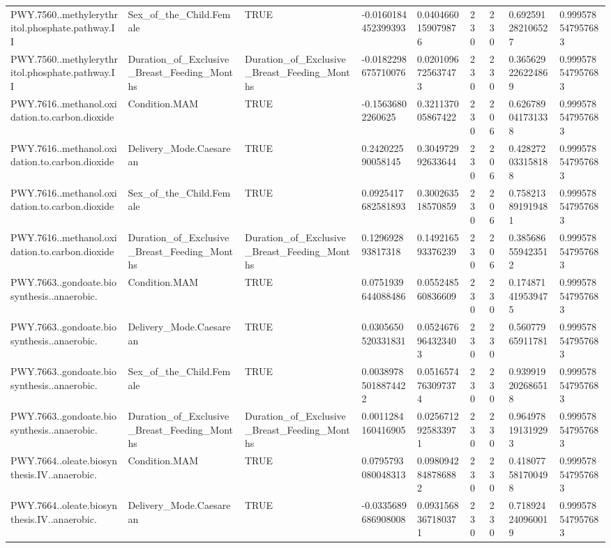 \begin{longtable}{lllllllll}
PWY.7560..methylerythritol.phosphate.pathway.II & Sex\_of\_the\_Child.Female & TRUE & -0.0160184452399393 & 0.0404660159079876 & 230 & 230 & 0.692591282106527 & 0.999578547957683 \\
PWY.7560..methylerythritol.phosphate.pathway.II & Duration\_of\_Exclusive\_Breast\_Feeding\_Months & Duration\_of\_Exclusive\_Breast\_Feeding\_Months & -0.0182298675710076 & 0.0201096725637473 & 230 & 230 & 0.365629226224869 & 0.999578547957683 \\
PWY.7616..methanol.oxidation.to.carbon.dioxide & Condition.MAM & TRUE & -0.15636802260625 & 0.321137005867422 & 230 & 206 & 0.626789041731338 & 0.999578547957683 \\
PWY.7616..methanol.oxidation.to.carbon.dioxide & Delivery\_Mode.Caesarean & TRUE & 0.242022590058145 & 0.304972992633644 & 230 & 206 & 0.428272033158188 & 0.999578547957683 \\
PWY.7616..methanol.oxidation.to.carbon.dioxide & Sex\_of\_the\_Child.Female & TRUE & 0.0925417682581893 & 0.300263518570859 & 230 & 206 & 0.758213891919481 & 0.999578547957683 \\
PWY.7616..methanol.oxidation.to.carbon.dioxide & Duration\_of\_Exclusive\_Breast\_Feeding\_Months & Duration\_of\_Exclusive\_Breast\_Feeding\_Months & 0.129692893817318 & 0.149216593376239 & 230 & 206 & 0.385686559423512 & 0.999578547957683 \\
PWY.7663..gondoate.biosynthesis..anaerobic. & Condition.MAM & TRUE & 0.0751939644088486 & 0.055248560836609 & 230 & 230 & 0.174871419539475 & 0.999578547957683 \\
PWY.7663..gondoate.biosynthesis..anaerobic. & Delivery\_Mode.Caesarean & TRUE & 0.0305650520331831 & 0.0524676964323403 & 230 & 230 & 0.56077965911781 & 0.999578547957683 \\
PWY.7663..gondoate.biosynthesis..anaerobic. & Sex\_of\_the\_Child.Female & TRUE & 0.00389785018874422 & 0.0516574763097374 & 230 & 230 & 0.939919202686518 & 0.999578547957683 \\
PWY.7663..gondoate.biosynthesis..anaerobic. & Duration\_of\_Exclusive\_Breast\_Feeding\_Months & Duration\_of\_Exclusive\_Breast\_Feeding\_Months & 0.0011284160416905 & 0.0256712925833971 & 230 & 230 & 0.964978191319293 & 0.999578547957683 \\
PWY.7664..oleate.biosynthesis.IV..anaerobic. & Condition.MAM & TRUE & 0.0795793080048313 & 0.0980942848786882 & 230 & 230 & 0.418077581700498 & 0.999578547957683 \\
PWY.7664..oleate.biosynthesis.IV..anaerobic. & Delivery\_Mode.Caesarean & TRUE & -0.0335689686908008 & 0.0931568367180371 & 230 & 230 & 0.718924240960019 & 0.999578547957683 \\

\end{longtable}
